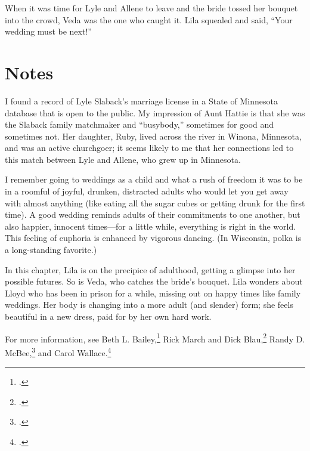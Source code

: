 \documentclass[
  american,
  letterpaper,
]{book}
\begin{document}
When it was time for Lyle and Allene to leave and the bride tossed her
bouquet into the crowd, Veda was the one who caught it. Lila squealed
and said, ``Your wedding must be next!''

\section{Notes}\label{notes-21}

I found a record of Lyle Slaback's marriage license in a State of
Minnesota database that is open to the public. My impression of Aunt
Hattie is that she was the Slaback family matchmaker and ``busybody,''
sometimes for good and sometimes not. Her daughter, Ruby, lived across
the river in Winona, Minnesota, and was an active churchgoer; it seems
likely to me that her connections led to this match between Lyle and
Allene, who grew up in Minnesota.

I remember going to weddings as a child and what a rush of freedom it
was to be in a roomful of joyful, drunken, distracted adults who would
let you get away with almost anything (like eating all the sugar cubes
or getting drunk for the first time). A good wedding reminds adults of
their commitments to one another, but also happier, innocent times---for
a little while, everything is right in the world. This feeling of
euphoria is enhanced by vigorous dancing. (In Wisconsin, polka is a
long-standing favorite.)

In this chapter, Lila is on the precipice of adulthood, getting a
glimpse into her possible futures. So is Veda, who catches the bride's
bouquet. Lila wonders about Lloyd who has been in prison for a while,
missing out on happy times like family weddings. Her body is changing
into a more adult (and slender) form; she feels beautiful in a new
dress, paid for by her own hard work.

For more information, see Beth L. Bailey,\footnote{.} Rick March and
Dick Blau,\footnote{.} Randy D. McBee,\footnote{.} and
Carol Wallace.\footnote{.}
\end{document}
